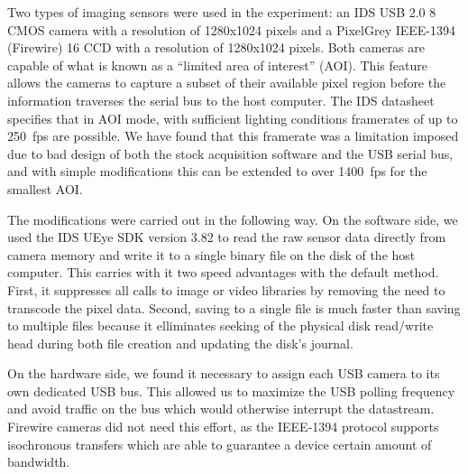 Two types of imaging sensors were used in the experiment: an IDS USB 2.0
\SI{8}{\bit} CMOS camera with a resolution of 1280x1024 pixels and a PixelGrey
IEEE-1394 (Firewire) \SI{16}{\bit} CCD  with a resolution of 1280x1024 pixels.
Both cameras are capable of what is known as a ``limited area of interest''
(AOI).  This feature allows the cameras to capture a subset of their
available pixel region before the information traverses the serial
bus to the host computer.  The IDS datasheet specifies that in AOI mode,
with sufficient lighting conditions framerates of up to \SI{250}{fps} are
possible.  We have found that this framerate was a limitation imposed due
to bad design of both the stock acquisition software and the USB serial
bus, and with simple modifications this can be extended to over
\SI{1400}{fps} for the smallest AOI.

The modifications were carried out in the following way.  On the software
side, we used the IDS UEye SDK version 3.82 to read the raw sensor data
directly from camera memory and write it to a single binary file on the
disk of the host computer.  This carries with it two speed advantages with
the default method.  First, it suppresses all calls to image or video
libraries by removing the need to transcode the pixel data.  Second, saving
to a single file is much faster than saving to multiple files because it
elliminates seeking of the physical disk read/write head during both file
creation and updating the disk's journal.  

On the hardware side, we found it necessary to assign each USB camera to
its own dedicated USB bus.  This allowed us to maximize the USB polling
frequency and avoid traffic on the bus which would otherwise interrupt the
datastream.  Firewire cameras did not need this effort, as the IEEE-1394
protocol supports isochronous transfers which are able to guarantee a
device certain amount of bandwidth.


